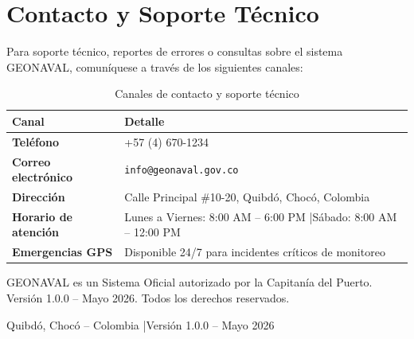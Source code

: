 \documentclass[12pt,a4paper]{report}
\begin{document}
\chapter{Contacto y Soporte Técnico}

Para soporte técnico, reportes de errores o consultas sobre el sistema GEONAVAL, comuníquese a través de los siguientes canales:

\begin{table}[H]
  \centering
  \renewcommand{\arraystretch}{1.5}
  \begin{tabularx}{\textwidth}{@{}L{4.5cm} X@{}}
    \toprule
    \textbf{Canal} & \textbf{Detalle} \\
    \midrule
    \textbf{Teléfono} & +57 (4) 670-1234 \\
    \textbf{Correo electrónico} & \texttt{info@geonaval.gov.co} \\
    \textbf{Dirección} & Calle Principal \#10-20, Quibdó, Chocó, Colombia \\
    \textbf{Horario de atención} & Lunes a Viernes: 8:00 AM – 6:00 PM \quad|\quad Sábado: 8:00 AM – 12:00 PM \\
    \textbf{Emergencias GPS} & Disponible 24/7 para incidentes críticos de monitoreo \\
    \bottomrule
  \end{tabularx}
  \caption{Canales de contacto y soporte técnico}
\end{table}

\vspace{1cm}
\begin{tcolorbox}[colback=navyblue!8, colframe=navyblue, title={\textbf{Información Legal}}]
GEONAVAL es un Sistema Oficial autorizado por la Capitanía del Puerto.\\
Versión 1.0.0 – Mayo 2026. Todos los derechos reservados.
\end{tcolorbox}

\vfill
\begin{center}
  \small\color{gray} Quibdó, Chocó – Colombia \quad|\quad Versión 1.0.0 – Mayo 2026
\end{center}
\end{document}
